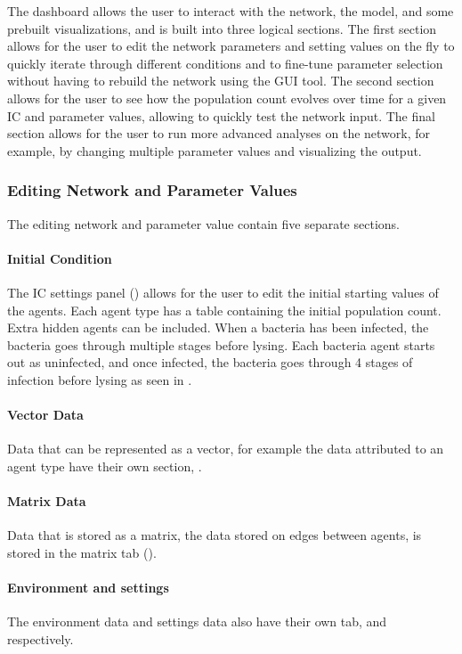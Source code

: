 The dashboard allows the user to interact with the network, the model, and some prebuilt visualizations, and is built into three logical sections.
The first section allows for the user to edit the network parameters and setting values on the fly to quickly iterate through different conditions and to fine-tune parameter selection without having to rebuild the network using the GUI tool.
The second section allows for the user to see how the population count evolves over time for a given IC and parameter values, allowing to quickly test the network input.
The final section allows for the user to run more advanced analyses on the network, for example, by changing multiple parameter values and visualizing the output. 

\subsubsection{Editing Network and Parameter Values}
\label{sec:editing_network_and_parameter_values}
The editing network and parameter value contain five separate sections.
\paragraph{Initial Condition}
The IC settings panel () allows for the user to edit the initial starting values of the agents. 
Each agent type has a table containing the initial population count. 
Extra hidden agents can be included. 
When a bacteria has been infected, the bacteria goes through multiple stages before lysing. Each bacteria agent starts out as uninfected, and once infected, the bacteria goes through 4 stages of infection before lysing as seen in .  
\paragraph{Vector Data} 
Data that can be represented as a vector, for example the data attributed to an agent type have their own section, .
\paragraph{Matrix Data}
Data that is stored as a matrix, the data stored on edges between agents, is stored in the matrix tab ().
\paragraph{Environment and settings}
The environment data and settings data also have their own tab,  and  respectively.

